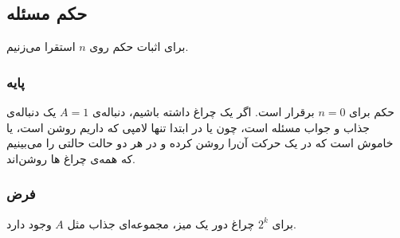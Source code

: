 \documentclass[12pt,a4paper]{article}
\begin{document}
\subsection*{حکم مسئله}
برای اثبات حکم روی $n$ استقرا می‌زنیم.
\subsubsection*{پایه}
حکم برای $n=0$ برقرار است. اگر یک چراغ داشته باشیم، دنباله‌ی $A = {1}$ یک دنباله‌ی جذاب و جواب مسئله است، چون یا در ابتدا تنها لامپی که داریم روشن است، یا خاموش است که در یک حرکت آن‌را روشن کرده و در هر دو حالت حالتی را می‌بینیم که همه‌ی چراغ ها روشن‌اند.
\subsubsection*{فرض}
برای $2^k$ چراغ دور یک میز، مجموعه‌ای جذاب مثل $A$ وجود دارد.
\end{document}
